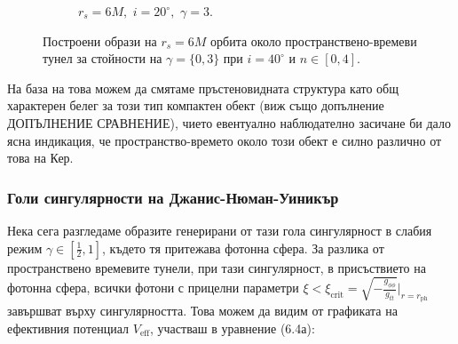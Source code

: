\begin{figure}[!htb]
\begin{subfigure}{6cm}
		\caption{$r_s = 6M,\,\, i = 20^\circ,\,\,\gamma = 3$.}
	\end{subfigure}
	\caption[Построени образи на $r_s = 6M$ орбита около пространствено-времеви тунел за различни стойности на $\gamma$ при $i \ 20^\circ$.]{\small Построени образи на $r_s = 6M$ орбита около пространствено-времеви тунел за стойности на $\gamma = \{0, 3\}$ при $i = 40^\circ$ и $n\in[0,4]$.} 
	\label{WH_gamma_20_deg}
\end{figure}
На база на това можем да смятаме пръстеновидната структура като общ характерен белег за този тип компактен обект (виж също допълнение ДОПЪЛНЕНИЕ СРАВНЕНИЕ), чието евентуално наблюдателно засичане би дало ясна индикация, че пространство-времето около този обект е силно различно от това на Кер.
\newpage
\subsubsection{Голи сингулярности на Джанис-Нюман-Уиникър}

Нека сега разгледаме образите генерирани от тази гола сингулярност в слабия режим $\gamma\in\left[\frac{1}{2},1\right]$, където тя притежава фотонна сфера. За разлика от пространствено времевите тунели, при тази сингулярност, в присъствието на фотонна сфера, всички фотони с прицелни параметри $\xi <\xi_\text{crit} = \sqrt{-\frac{g_{\phi\phi}}{g_{tt}}}\big\vert_{r = r_\text{ph}}$ завършват върху сингулярността. Това можем да видим от графиката на ефективния потенциал $V_\text{eff}$, участваш в уравнение (6.4а):

